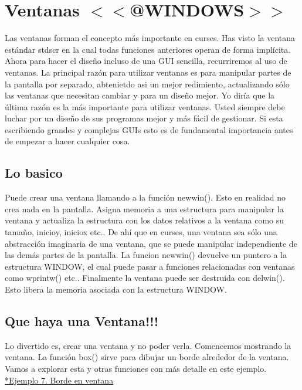 \documentclass{article}
\begin{document}
\section{Ventanas $<<$@WINDOWS$>>$}%
Las ventanas forman el concepto más importante en curses. Has visto la ventana
estándar stdscr en la cual todas funciones anteriores operan de forma
implícita. Ahora para hacer el diseño incluso de una GUI sencilla, recurriremos
al uso de ventanas. La principal razón para utilizar ventanas es para manipular
partes de la pantalla por separado, abtenietdo asi un mejor redimiento,
actualizando sólo las ventanas que necesitan cambiar y para un diseño mejor. Yo
diría que la última razón es la más importante para utilizar ventanas. Usted
siempre debe luchar por un diseño de sus programas mejor y más fácil de
gestionar. Si esta escribiendo grandes y complejas GUIs esto es de fundamental
importancia antes de empezar a hacer cualquier cosa.

\subsection{Lo basico}%
Puede crear una ventana llamando a la función newwin(). Esto en realidad no
crea nada en la pantalla. Asigna memoria a una estructura para manipular la
ventana y actualiza la estructura con los datos relativos a la ventana como su
tamaño, inicioy, iniciox etc.. De ahí que en curses, una ventana sea sólo una
abstracción imaginaria de una ventana, que se puede manipular independiente de
las demás partes de la pantalla. La funcion newwin() devuelve un puntero a la
estructura WINDOW, el cual puede pasar a funciones relacionadas con ventanas
como wprintw() etc.. Finalmente la ventana puede ser destruida con delwin().
Esto libera la memoria asociada con la estructura WINDOW.

\subsection{Que haya una Ventana!!!}%
Lo divertido es, crear una ventana y no poder verla. Comencemos mostrando la
ventana. La función box() sirve para dibujar un borde alrededor de la ventana.
Vamos a explorar esta y otras funciones con más detalle en este ejemplo.\\

\href{https://github.com/nasciiboy/NCURSES-Programming-HOWTO/blob/master/ncurses_programs/basics/win_border.c}{*Ejemplo 7. Borde en ventana}
\inputminted{cpp}{./cpp/007_borde_en_ventana.cpp}
\end{document}
